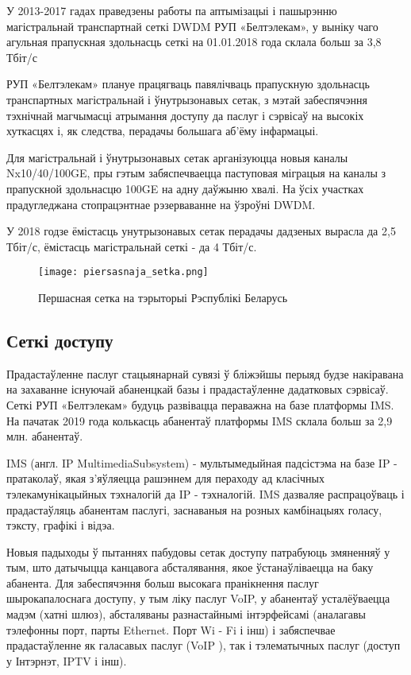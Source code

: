 У 2013-2017 гадах праведзены работы па аптымізацыі і пашырэнню магістральнай транспартнай сеткі DWDM РУП «Белтэлекам», у выніку чаго агульная прапускная здольнасць сеткі на 01.01.2018 года склала больш за 3,8 Тбіт/с

РУП «Белтэлекам» плануе працягваць павялічваць прапускную здольнасць транспартных магістральнай і ўнутрызонавых сетак, з мэтай забеспячэння тэхнічнай магчымасці атрымання доступу да паслуг і сэрвісаў на высокіх хуткасцях і, як следства, перадачы большага аб'ёму інфармацыі.

Для магістральнай і ўнутрызонавых сетак арганізуюцца новыя каналы Nx10/40/100GE, пры гэтым забяспечваецца паступовая міграцыя на каналы з прапускной здольнасцю 100GE на адну даўжыню хвалі. На ўсіх участках прадугледжана стопрацэнтнае рэзерваванне на ўзроўні DWDM.

У 2018 годзе ёмістасць унутрызонавых сетак перадачы дадзеных вырасла да 2,5 Тбіт/с, ёмістасць магістральнай сеткі - да 4 Тбіт/с.

\begin{figure}[ht!]
    \texttt{[image: piersasnaja\_setka.png]}
    \caption{Першасная сетка на тэрыторыі Рэспублікі Беларусь}
\end{figure}

\subsection{Сеткі доступу}
Прадастаўленне паслуг стацыянарнай сувязі ў бліжэйшы перыяд будзе накіравана на захаванне існуючай абаненцкай базы і прадастаўленне дадатковых сэрвісаў. Сеткі РУП «Белтэлекам» будуць развівацца пераважна на базе платформы IMS. На пачатак 2019 года колькасць абанентаў платформы IMS склала больш за 2,9 млн. абанентаў.

IMS (англ. IP MultimediaSubsystem) - мультымедыйная падсістэма на базе IP - пратаколаў, якая з'яўляецца рашэннем для пераходу ад класічных тэлекамунікацыйных тэхналогій да IP - тэхналогій. IMS дазваляе распрацоўваць і прадастаўляць абанентам паслугі, заснаваныя на розных камбінацыях голасу, тэксту, графікі і відэа.

Новыя падыходы ў пытаннях пабудовы сетак доступу патрабуюць змяненняў у тым, што датычыцца канцавога абсталявання, якое ўстанаўліваецца на баку абанента. Для забеспячэння больш высокага пранікнення паслуг шырокапалоснага доступу, у тым ліку паслуг VoIP, у абанентаў усталёўваецца мадэм (хатні шлюз), абсталяваны разнастайнымі інтэрфейсамі (аналагавы тэлефонны порт, парты Ethernet. Порт Wi - Fi і інш) і забяспечвае прадастаўленне як галасавых паслуг (VoIP ), так і тэлематычных паслуг (доступ у Інтэрнэт, IPTV і інш).

